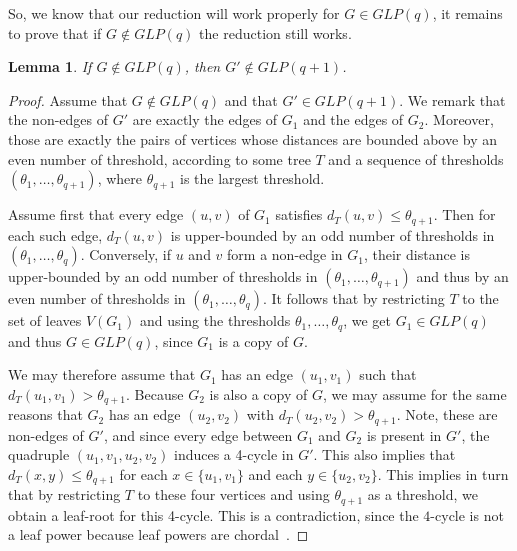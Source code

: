 \documentclass[11pt, letter]{article}
\newtheorem{lm}[theorem]{Lemma}
\theoremstyle{remark}
\begin{document}
So, we know that our reduction will work properly for $G\in GLP(q)$, it remains to prove that if $G\notin GLP(q)$ the reduction still works.

\begin{lm}\label{lem:reduction-conv}
    If $G\not\in GLP(q)$, then $G'\notin GLP(q+1)$.
\end{lm} 

\begin{proof}
    Assume that $G\notin GLP(q)$ and that $G'\in GLP(q+1)$. We remark that the non-edges of $G'$ are exactly the edges of $G_1$ and the edges of $G_2$. Moreover, those are exactly the pairs of vertices whose distances are bounded above by an even number of threshold, according to some tree $T$ and a sequence of thresholds $(\theta_1, \ldots, \theta_{q+1})$, where $\theta_{q+1}$ is the largest threshold.

    Assume first that every edge $(u, v)$ of $G_1$ satisfies $d_T(u, v) \leq \theta_{q+1}$.  Then for each such edge,  $d_T(u, v)$ is upper-bounded by an odd number of thresholds in $(\theta_1,\dots,\theta_q)$.
    Conversely, if $u$ and $v$ form a non-edge in $G_1$, their distance is upper-bounded by an odd number of thresholds in $(\theta_1, \ldots, \theta_{q+1})$ and thus by an even number of thresholds in $(\theta_1, \ldots, \theta_q)$.  It follows that by restricting $T$ to the set of leaves $V(G_1)$ and using the thresholds $\theta_1,\dots,\theta_q$, we get $G_1 \in GLP(q)$ and thus $G \in GLP(q)$, since $G_1$ is a copy of $G$.  

    We may therefore assume that $G_1$ has an edge $(u_1, v_1)$ such that $d_T(u_1, v_1) > \theta_{q+1}$.  Because $G_2$ is also a copy of $G$, we may assume for the same reasons that $G_2$ has an edge $(u_2, v_2)$ with $d_T(u_2, v_2) > \theta_{q+1}$.  Note, these are non-edges of $G'$, and since every edge between $G_1$ and $G_2$ is present in $G'$, the quadruple $(u_1, v_1, u_2, v_2)$ induces a 4-cycle in $G'$.  
    This also implies that $d_T(x, y) \leq \theta_{q+1}$ for each $x \in \{u_1, v_1\}$ and each $y \in \{u_2, v_2\}$.  
    This implies in turn that by restricting $T$ to these four vertices and using $\theta_{q+1}$ as a threshold, we obtain a leaf-root for this 4-cycle.  This is a contradiction, since the $4$-cycle is not a leaf power because leaf powers are chordal~\cite{Ray92}.
    
    

\end{proof}
\end{document}
